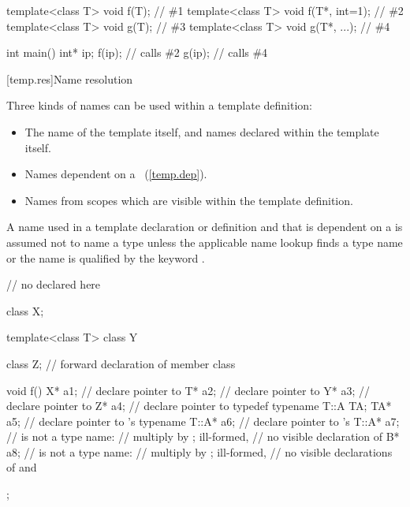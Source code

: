 \begin{codeblock}
template<class T> void f(T);            // \#1
template<class T> void f(T*, int=1);    // \#2
template<class T> void g(T);            // \#3
template<class T> void g(T*, ...);      // \#4

\end{codeblock}
\begin{codeblock}
int main() {
	int* ip;
	f(ip);			// calls \#2
	g(ip);			// calls \#4
}
\end{codeblock}
\exitexampleb

[temp.res]{Name resolution}

\pnum
{}%
%
Three kinds of names can be used within a template definition:

\begin{itemize}
\item
The name of the template itself,
and names declared within the template itself.
\item
Names dependent on a
~(\ref{temp.dep}).
\item
Names from scopes which are visible within the template definition.
\end{itemize}

\pnum
A name used in a template declaration or definition and that is
dependent on a
is assumed not to name a type unless
the applicable name lookup finds a type name or the name
is qualified by the keyword
.
\enterexample

\begin{codeblock}
// no  declared here

class X;

template<class T> class Y {
	class Z;                // forward declaration of member class

	void f() {
		X* a1;          // declare pointer to 
		T* a2;          // declare pointer to 
		Y* a3;          // declare pointer to 
		Z* a4;          // declare pointer to 
		typedef typename T::A TA;
		TA* a5;			// declare pointer to 's 
		typename T::A* a6;      // declare pointer to 's 
		T::A* a7;               //  is not a type name:
					// multiply  by ; ill-formed,
					// no visible declaration of 
		B* a8;                  //  is not a type name:
					// multiply  by ; ill-formed,
					// no visible declarations of  and 
	}
};
\end{codeblock}
\exitexampleb

